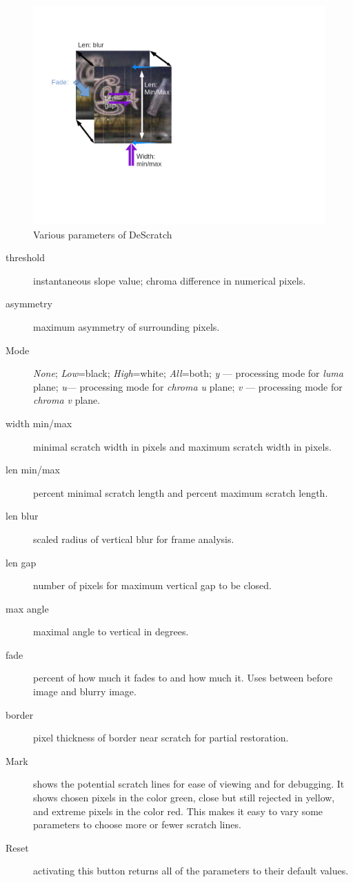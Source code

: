 \begin{figure}[htpb]
    \centering
    \includegraphics[width=0.8\linewidth]{images/descratch02.png}
    \caption{Various parameters of DeScratch}
    \label{fig:descratch02}
\end{figure}

\begin{description}
    \item[threshold] instantaneous slope value; chroma difference in numerical pixels.
    \item[asymmetry] maximum asymmetry of surrounding
    pixels.
    \item[Mode] \textit{None}; \textit{Low}=black; \textit{High}=white; \textit{All}=both;
    \textit{y} --- processing mode for \textit{luma} plane; 
    \textit{u}--- processing mode for \textit{chroma u} plane;
    \textit{v} --- processing mode for \textit{chroma v} plane.
    \item[width min/max] minimal scratch width in pixels and maximum scratch width in pixels.
    \item[len min/max] percent minimal scratch length and percent maximum scratch length.
    \item[len blur] scaled radius of vertical blur for frame
    analysis.
    \item[len gap] number of pixels for maximum vertical gap
    to be closed.
    \item[max angle] maximal angle to vertical in degrees.
    \item[fade] percent of how much it fades to and how much it. Uses between before image and blurry image.
    \item[border] pixel thickness of border near scratch for partial restoration.
    \item[Mark] shows the potential scratch lines for ease of viewing and for debugging. It shows chosen pixels in the color green, close but still rejected in yellow, and extreme pixels in the color red. This makes it easy to vary some parameters to choose more or fewer scratch lines.
    \item[Reset] activating this button returns all of the parameters to their default values.
\end{description}

